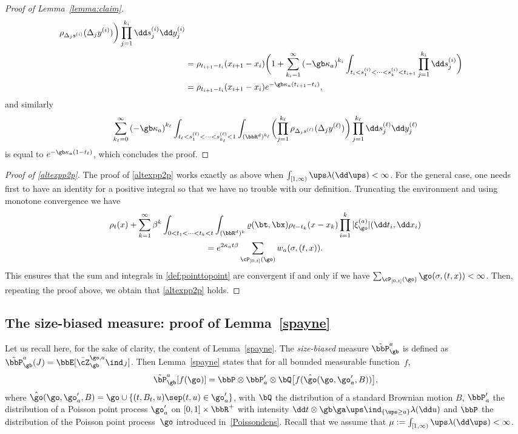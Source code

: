\begin{proof}[Proof of Lemma~\ref{lemma:claim}]
\begin{align*}
\rho_{\Delta_j s^{(i)}}(\Delta_j y^{(i)}) \biggr) \prod_{j=1}^{k_i}\dd s^{(i)}_j \dd y^{(i)}_j
\\
&= \rho_{t_{i+1} -t_i}(x_{i+1}-x_i) \biggl(1+ \sum_{k_i=1}^\infty \left(-\gb \kappa_a \right)^{k_i} \int_{t_{i}<s^{(i)}_1<\dots<s^{(i)}_k<t_{i+1}} \prod_{j=1}^{k_i}\dd s^{(i)}_j \biggr)\\
& = \rho_{t_{i+1} -t_i}(x_{i+1}-x_i) e^{-\gb \kappa_a (t_{i+1}-t_i)},
\end{align*}
and similarly
\[
\sum_{k_{\ell}=0}^\infty \left(-\gb \kappa_a\right)^{k_{\ell}} \int_{t_{\ell}<s^{ (\ell)}_1<\dots<s^{ (\ell)}_{k_{\ell}}<1}\int_{(\bbR^d)^{k_{\ell}}}
\biggl(\prod_{j=1}^{k_{\ell}}
\rho_{\Delta_j s^{(\ell)}}(\Delta_j y^{(\ell)}) \biggr) \prod_{j=1}^{k_{\ell}} \dd s^{(\ell)}_j \dd y^{(\ell)}_j
\]
is equal to $e^{-\gb \kappa_a (1-t_{\ell})}$,
which concludes the proof.
\end{proof}

\begin{proof}[Proof of \eqref{altexpp2p}]
The proof of \eqref{altexpp2p} works exactly as above when $\int_{[1,\infty)} \ups \lambda(\dd \ups) <\infty$. For the general case, one needs first to have an identity for a positive integral so that we have no trouble with our definition.
Truncating the environment and using monotone convergence we have
\begin{multline}
\rho_t(x) + \sum_{k=1}^\infty \beta^k\int_{0<t_1<\dots<t_k<t}\int_{(\bbR^d)^k} \varrho(\bt,\bx) \rho_{t-t_k}(x-x_k)\prod_{i=1}^k |\xi_{\go}^{(a)}| (\dd t_i, \dd x_i)
\\ = e^{2\kappa_a t\beta }\sum_{\cP_{[0,t]}(\go)}w_a(\sigma,(t,x)).
\end{multline}
This ensures that the sum and integrals in \eqref{def:pointtopoint} are convergent if and only if we have
$\sum_{\cP_{[0,t]}(\go)}\go(\sigma,(t,x))<\infty$. Then, repeating the proof above, we obtain that \eqref{altexpp2p} holds.
\end{proof}

\subsection{The size-biased measure: proof of Lemma~\ref{spayne}}\label{App:spayne}

Let us recall here, for the sake of clarity, the content of Lemma~\ref{spayne}.
The \emph{size-biased} measure $\tilde \bbP_{\gb}^{a}$ is defined as
$\tilde \bbP_{\gb}^{a}(J) = \bbE[\bar \cZ_{\gb}^{\go,a} \ind_{J}]$.
Then Lemma~\ref{spayne}
states that for all bounded measurable function~$f$,
\[
\tilde \bP_{\gb}^{a}[f(\go)] = \bbP\otimes \bbP'_a\otimes \bQ \bigl[ f(\hat \go(\go,\go'_a,B)) \bigr],
\]
where $\hat \go(\go,\go'_a,B) = \go \cup\{ (t,B_t,u) \sep (t,u)\in \go_a'\}$,
with $\bQ$ the distribution of a standard Brownian motion $B$, $\bbP_a'$ the distribution
of a Poisson point process $\go_a'$ on \hbox{$[0,1]\times \bbR^+$}
with intensity $\dd t \otimes \gb \ga \ups \ind_{\{\ups\geq a\}} \lambda(\dd u)$ and $\bbP$ the distribution of the Poisson point process~$\go$ introduced in~\eqref{Poissondens}. Recall that we assume that $\mu:=\int_{[1,\infty)} \ups \lambda(\dd \ups) <\infty$.

